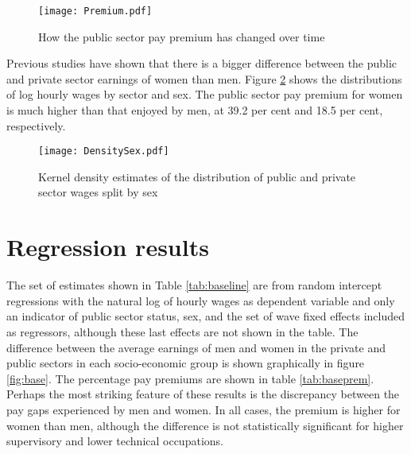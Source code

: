 \documentclass[a4paper,11pt,titlepage]{article}
\begin{document}
\begin{figure}[tb]
    \centering
    \texttt{[image: Premium.pdf]}
    \caption{How the public sector pay premium has changed over time\label{fig:premium}}
\end{figure}

Previous studies have shown that there is a bigger difference between the public and private sector earnings of women than men.  Figure \ref{fig:densitysex} shows the distributions of log hourly wages by sector and sex.  The public sector pay premium for women is much higher than that enjoyed by men, at 39.2 per cent and 18.5 per cent, respectively.

\begin{figure}[tb]
    \centering
    \texttt{[image: DensitySex.pdf]}
    \caption{Kernel density estimates of the distribution of public and private sector wages split by sex\label{fig:densitysex}}
\end{figure}

\section{Regression results}
The set of estimates shown in Table \ref{tab:baseline} are from random intercept regressions with the natural log of hourly wages as dependent variable and only an indicator of public sector status, sex, and the set of wave fixed effects included as regressors, although these last effects are not shown in the table.  The difference between the average earnings of men and women in the private and public sectors in each socio-economic group is shown graphically in figure \ref{fig:base}. The percentage pay premiums are shown in table \ref{tab:baseprem}.  Perhaps the most striking feature of these results is the discrepancy between the pay gaps experienced by men and women.  In all cases, the premium is higher for women than men, although the difference is not statistically significant for higher supervisory and lower technical occupations.
\end{document}
